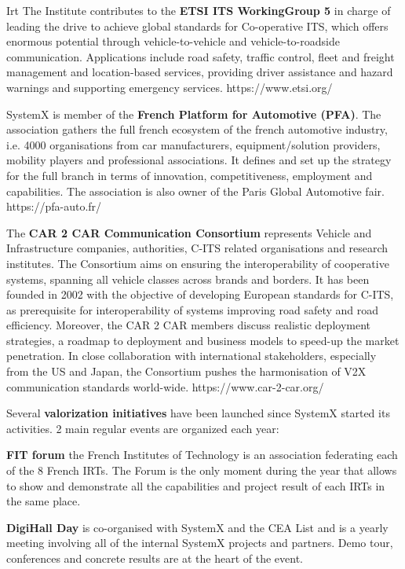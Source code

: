 \begin{sitedescription}{Irt}
The Institute contributes to the {\bf ETSI ITS WorkingGroup 5} in charge of leading the drive to achieve global standards for Co-operative ITS, which offers enormous potential through vehicle-to-vehicle and vehicle-to-roadside communication. Applications include road safety, traffic control, fleet and freight management and location-based services, providing driver assistance and hazard warnings and supporting emergency services. https://www.etsi.org/

SystemX is member of the {\bf French Platform for Automotive (PFA)}. The association gathers the full french ecosystem of the french automotive industry, i.e. 4000 organisations from car manufacturers, equipment/solution providers, mobility players and professional associations. It defines and set up the strategy for the full branch in terms of innovation, competitiveness, employment and capabilities. The association is also owner of the Paris Global Automotive fair. https://pfa-auto.fr/

The {\bf CAR 2 CAR Communication Consortium} represents Vehicle and Infrastructure companies, authorities, C-ITS related organisations and research institutes. The Consortium aims on ensuring the interoperability of cooperative systems, spanning all vehicle classes across brands and borders. It has been founded in 2002 with the objective of developing European standards for C-ITS, as prerequisite for interoperability of systems improving road safety and road efficiency. Moreover, the CAR 2 CAR members discuss realistic deployment strategies, a roadmap to deployment and business models to speed-up the market penetration. In close collaboration with international stakeholders, especially from the US and Japan, the Consortium pushes the harmonisation of V2X communication standards world-wide. https://www.car-2-car.org/

Several {\bf valorization initiatives} have been launched since SystemX started its activities. 2 main regular events are organized each year:
\begin{compactitem}
\item {\bf FIT forum} the French Institutes of Technology is an association federating each of the 8 French IRTs. The Forum is the only moment during the year that allows to show and demonstrate all the capabilities and project result of each IRTs in the same place.
\item {\bf DigiHall Day} is co-organised with SystemX and the CEA List and is a yearly meeting involving all of the internal SystemX projects and partners. Demo tour, conferences and concrete results are at the heart of the event.
\end{compactitem}





\end{sitedescription}
